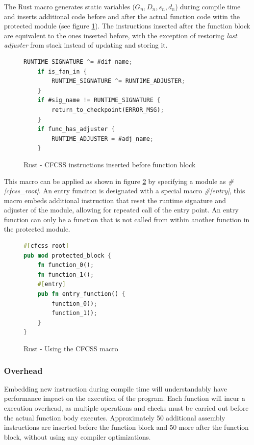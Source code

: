 The Rust macro generates static variables ({$G_n, D_n, s_n, d_n$}) during compile time and inserts additional code before and after the actual function code witin the protected module (see figure \ref{fig:rust_cfcss_macro}). The instructions inserted after the function block are equivalent to the ones inserted before, with the exception of restoring \textit{last adjuster} from stack instead of updating and storing it.

\begin{figure}[!h]
    \begin{lstlisting}[language=Rust]
    RUNTIME_SIGNATURE ^= #dif_name;
    if is_fan_in {
        RUNTIME_SIGNATURE ^= RUNTIME_ADJUSTER;
    }
    if #sig_name != RUNTIME_SIGNATURE {
        return_to_checkpoint(ERROR_MSG);
    }
    if func_has_adjuster {
        RUNTIME_ADJUSTER = #adj_name;
    }
    \end{lstlisting}
    \caption{Rust - CFCSS instructions inserted before function block}
    \label{fig:rust_cfcss_macro}
    \end{figure}

This macro can be applied as shown in figure \ref{fig:rust_cfcss_macro_example} by specifying a module as \textit{\#[cfcss\_root]}. An entry funciton is designated with a special macro \textit{\#[entry]}, this macro embeds additional instruction that reset the runtime signature and adjuster of the module, allowing for repeated call of the entry point. An entry function can only be a function that is not called from within another function in the protected module.

\begin{figure}[!h]
\begin{lstlisting}[language=Rust]
#[cfcss_root]
pub mod protected_block {
    fn function_0();
    fn function_1();
    #[entry]
    pub fn entry_function() {
        function_0();
        function_1();
    }
}
\end{lstlisting}
\caption{Rust - Using the CFCSS macro}
\label{fig:rust_cfcss_macro_example}
\end{figure}

\subsubsection{Overhead}

Embedding new instruction during compile time will understandably have performance impact on the execution of the program. Each function will incur a execution overhead, as multiple operations and checks must be carried out before the actual function body executes. Approximately 50 additional assembly instructions are inserted before the function block and 50 more after the function block, without using any compiler optimizations.

